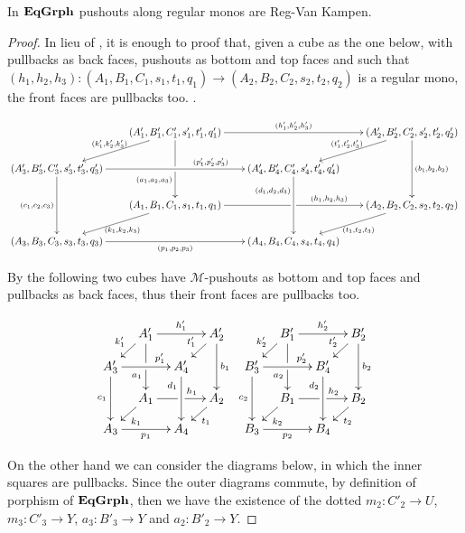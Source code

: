 \begin{lemma}\label{lem:vk}
In $\mathbf{EqGrph}$ pushouts along regular monos are Reg-Van Kampen.
\end{lemma}
\begin{proof}
In lieu of , it is enough to proof that, given a cube as the one below, with pullbacks as back faces, pushouts as bottom and top faces and such that $(h_1, h_2, h_3)\colon (A_1,B_1,C_1, s_1,t_1,q_1)\to (A_2,B_2,C_2, s_2,t_2,q_2)$ is a regular mono, the front faces are pullbacks too. .

\[\xymatrix@C=20pt@R=20pt{&(A'_1,B'_1,C'_1, s'_1,t'_1,q'_1)\ar[dd]|\hole_(.65){(a_1, a_2, a_3)}\ar[rr]^{(h'_1, h'_2, h'_3)} \ar[dl]_{(k'_1, k'_2, k'_3)} && (A'_2,B'_2,C'_2, s'_2,t'_2,q'_2) \ar[dd]^{(b_1, b_2, b_3)} \ar[dl]_{(t'_1, t'_2, t'_3)} \\ (A'_3,B'_3,C'_3, s'_3,t'_3,q'_3) \ar[dd]_{(c_1, c_2, c_3)}\ar[rr]^(.65){(p'_1,p'_2,p'_3)} & & (A'_4,B'_4,C'_4, s'_4,t'_4,q'_4) \ar[dd]_(.3){(d_1, d_2, d_3)}\\&(A_1,B_1,C_1, s_1,t_1,q_1)\ar[rr]|\hole^(.65){(h_1, h_2, h_3)} \ar[dl]^{(k_1, k_2, k_3)} && (A_2,B_2,C_2, s_2,t_2,q_2) \ar[dl]^{(t_1, t_2, t_3)} \\(A_3,B_3,C_3, s_3,t_3,q_3) \ar[rr]_{(p_1, p_2, p_3)} & & (A_4,B_4,C_4, s_4,t_4,q_4)}\]

By  the following two cubes have $\mathcal{M}$-pushouts as bottom and top faces and pullbacks as back faces, thus their front faces are pullbacks too.

\[\xymatrix@C=10pt@R=10pt{&A'_1\ar[dd]|\hole_(.65){a_1}\ar[rr]^{h'_1} \ar[dl]_{k'_1} && A'_2 \ar[dd]^{b_1} \ar[dl]_{t'_1} && B'_1\ar[dd]|\hole_(.65){a_2}\ar[rr]^{h'_2} \ar[dl]_{k'_2} && B'_2 \ar[dd]^{b_2} \ar[dl]_{t'_2}\\ A'_3  \ar[dd]_{c_1}\ar[rr]^(.7){p'_1} & & A'_4 \ar[dd]_(.3){d_1} &&B'_3  \ar[dd]_{c_2}\ar[rr]^(.7){p'_2} & & B'_4 \ar[dd]_(.3){d_2}\\&A_1\ar[rr]|\hole^(.65){h_1} \ar[dl]^{k_1} && A_2 \ar[dl]^{t_1} && B_1\ar[rr]|\hole^(.65){h_2} \ar[dl]^{k_2} && B_2 \ar[dl]^{t_2} \\A_3 \ar[rr]_{p_1} & & A_4&&B_3 \ar[rr]_{p_2} & & B_4}\]

On the other hand we can consider the diagrams below, in which the inner squares are pullbacks. Since the outer diagrams commute, by definition of porphism of $\mathbf{EqGrph}$, then we have the existence of the dotted $m_2\colon C'_2\to U$, $m_3\colon C'_3\to Y $, $a_3\colon B'_3\to Y$ and $a_2\colon B'_2\to Y$.


\end{proof}
